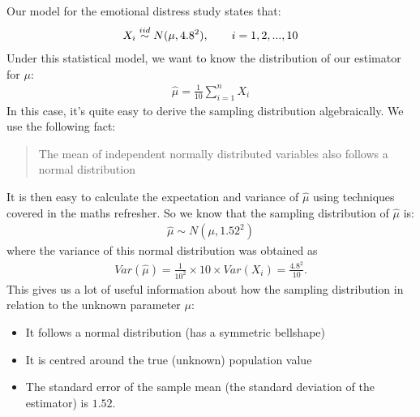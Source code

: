 \documentclass[letterpaper,10pt,english]{jupyterBook}
\begin{document}
\sphinxAtStartPar
Our model for the emotional distress study states that:
\begin{equation*}
\begin{split} 
X_i \overset{\small{iid}}{\sim} N(\mu, 4.8^2), \qquad i=1,2,...,10
\end{split}
\end{equation*}
\sphinxAtStartPar
Under this statistical model, we want to know the distribution of our estimator for \(\mu\):
\begin{equation*}
\begin{split}
\hat{\mu} = \frac{1}{10} \sum_{i=1}^n X_i
\end{split}
\end{equation*}
\sphinxAtStartPar
In this case, it’s quite easy to derive the sampling distribution algebraically. We use the following fact:
\begin{quote}

\sphinxAtStartPar
The mean of independent normally distributed variables also follows a normal distribution
\end{quote}

\sphinxAtStartPar
It is then  easy to calculate the expectation and variance of \(\hat{\mu}\) using techniques covered in the maths refresher. So we know that the sampling distribution of \(\hat{\mu}\) is:
\begin{equation*}
\begin{split}
\hat{\mu} \sim N\left(\mu, 1.52^2 \right) 
\end{split}
\end{equation*}
\sphinxAtStartPar
where the variance of this normal distribution was obtained as
\begin{equation*}
\begin{split}
Var(\hat{\mu}) = \frac{1}{10^2} \times 10 \times Var(X_i) = \frac{4.8^2}{10}.
\end{split}
\end{equation*}
\sphinxAtStartPar
This gives us a lot of useful information about how the sampling distribution in relation to the unknown parameter \(\mu\):
\begin{itemize}
\item {} 
\sphinxAtStartPar
It follows a normal distribution (has a symmetric bell\sphinxhyphen{}shape)

\item {} 
\sphinxAtStartPar
It is centred around the true (unknown) population value

\item {} 
\sphinxAtStartPar
The standard error of the sample mean (the standard deviation of the estimator) is  \(1.52\).

\end{itemize}
\end{document}
